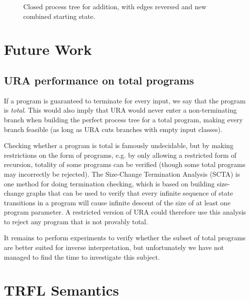 \documentclass[10pt]{../sigplanconf}
\newcommand{\gen}{\ensuremath{~{\leq\kern-6pt \raisebox{1pt}{$\cdot$}}~}}
\begin{document}
\begin{figure*}
\caption{Closed process tree for addition, with edges reversed and new
  combined starting state.}
  \label{fig:addtree}
\end{figure*}


\section{Future Work}
\subsection{URA performance on total programs}
If a program is guaranteed to terminate for every input, we say that
the program is \emph{total}. This would also imply that URA would
never enter a non-terminating branch when building the perfect process
tree for a total program, making every branch feasible (as long as URA
cuts branches with empty input classes).

Checking whether a program is total is famously undecidable, but by
making restrictions on the form of programs, e.g. by only allowing a
restricted form of recursion, totality of some programs can be
verified (though some total programs may incorrectly be rejected). The
Size-Change Termination Analysis (SCTA)\cite{lee2001size} is one
method for doing termination checking, which is based on building
size-change graphs that can be used to verify that every infinite
sequence of state transitions in a program will cause infinite descent
of the size of at least one program parameter. A restricted version of
URA could therefore use this analysis to reject any program that is
not provably total.

It remains to perform experiments to verify whether the subset of
total programs are better suited for inverse interpretation, but
unfortunately we have not managed to find the time to investigate this
subject.





\appendix
\section{TRFL Semantics}
\label{sec:semantics}
\end{document}

